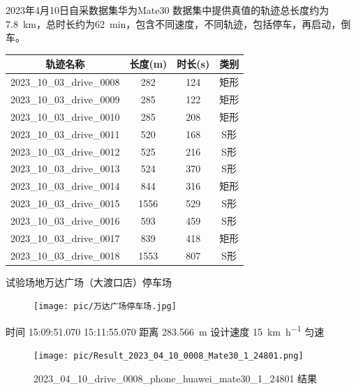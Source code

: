 \documentclass{beamer} %
\begin{document}
\begin{frame}{2023年4月10日自采数据集华为Mate30}
    数据集中提供真值的轨迹总长度约为\qty{7.8}{\km}，总时长约为\qty{62}{\minute}，包含不同速度，不同轨迹，包括停车，再启动，倒车。
    \begin{table}
        \scriptsize
        \begin{tabular}{cccc}
            \toprule
            轨迹名称 & 长度(\unit{\m}) & 时长(\unit{\s}) & 类别 \\
            \midrule
            2023\_10\_03\_drive\_0008 & 282 & 124 & 矩形 \\
            2023\_10\_03\_drive\_0009 & 285 & 122 & 矩形 \\
            2023\_10\_03\_drive\_0010 & 285 & 208 & 矩形 \\
            2023\_10\_03\_drive\_0011 & 520 & 168 & S形 \\
            2023\_10\_03\_drive\_0012 & 525 & 216 & S形 \\
            2023\_10\_03\_drive\_0013 & 524 & 370 & S形 \\
            2023\_10\_03\_drive\_0014 & 844 & 316 & 矩形 \\
            2023\_10\_03\_drive\_0015 & 1556 & 529 & S形 \\
            2023\_10\_03\_drive\_0016 & 593 & 459 & S形 \\
            2023\_10\_03\_drive\_0017 & 839 & 418 & 矩形 \\
            2023\_10\_03\_drive\_0018 & 1553 & 807 & S形 \\
            \bottomrule
        \end{tabular}
    \end{table}
\end{frame}

\begin{frame}{试验场地万达广场（大渡口店）停车场}
    \begin{figure}[htbp]
        \centering
        \texttt{[image: pic/万达广场停车场.jpg]}
    \end{figure}
\end{frame}

\begin{frame}
    时间 15:09:51.070  15:11:55.070 距离 \qty{283.566}{\meter}
    设计速度 \qty{15}{\km\per\hour} 匀速
    \begin{figure}[htbp]
        \centering
        \texttt{[image: pic/Result\_2023\_04\_10\_0008\_Mate30\_1\_24801.png]}
        \caption{2023\_04\_10\_drive\_0008\_phone\_huawei\_mate30\_1\_24801 结果}
        \label{fig:transformer-arc}
    \end{figure}
\end{frame}
\end{document}
